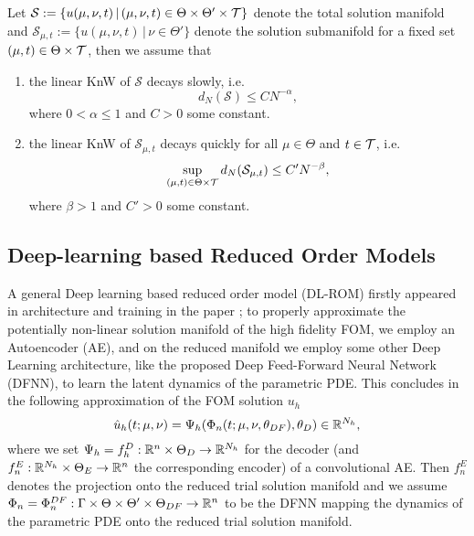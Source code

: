 \begin{assumption} \label{assumption KnW decay}
    Let $\mathcal{S} := \{ u(\mu, \nu, t) \, \vert \, (\mu, \nu, t) \in \Theta \times \Theta' \times \mathcal{T} \}$ denote the total solution manifold and $\mathcal{S}_{\mu, t} := \{ u(\mu, \nu, t) \, \vert \, \nu \in \Theta' \}$ denote the solution submanifold for a fixed set $(\mu, t) \in \Theta \times \mathcal{T}$, then we assume that
    \begin{enumerate}
        \item the linear KnW of $\mathcal{S}$ decays slowly, i.e. 
        \begin{equation*}
            d_N(\mathcal{S}) \leq C N^{-\alpha},
        \end{equation*}
        where $0 < \alpha \leq 1$ and $C > 0$ some constant.
        \item the linear KnW of $\mathcal{S}_{\mu, t}$ decays quickly for all $\mu \in \Theta$ and $t \in \mathcal{T}$, i.e. 
        \begin{equation*}
            \sup_{(\mu, t) \in \Theta \times \mathcal{T}} d_N(\mathcal{S}_{\mu, t}) \leq C' N^{-\beta},    
        \end{equation*}
        where $\beta > 1$ and $C' > 0$ some constant.
    \end{enumerate}
\end{assumption}


\subsection{Deep-learning based Reduced Order Models}


A general Deep learning based reduced order model (DL-ROM) firstly appeared in architecture and training in the paper \cite{DL-ROM}; to properly approximate the potentially non-linear solution manifold of the high fidelity FOM, we employ an Autoencoder (AE), and on the reduced manifold we employ some other Deep Learning architecture, like the proposed Deep Feed-Forward Neural Network (DFNN), to learn the latent dynamics of the parametric PDE. This concludes in the following approximation of the FOM solution $u_h$
\begin{equation}
    \hat{u}_h(t; \mu, \nu) = \Psi_h(\Phi_n(t; \mu, \nu, \theta_{DF}), \theta_{D}) \in \mathbb{R}^{N_h},
\end{equation}
where we set $\Psi_h = f^D_h : \mathbb{R}^n \times \Theta_D \to \mathbb{R}^{N_h}$ for the decoder (and $f^E_n: \mathbb{R}^{N_h} \times \Theta_E \to \mathbb{R}^n$ the corresponding encoder) of a convolutional AE. Then $f^E_n$ denotes the projection onto the reduced trial solution manifold and we assume $\Phi_n = \Phi_n^{DF} : \Gamma \times \Theta \times \Theta' \times \Theta_{DF} \to \mathbb{R}^n$ to be the DFNN mapping the dynamics of the parametric PDE onto the reduced trial solution manifold.

